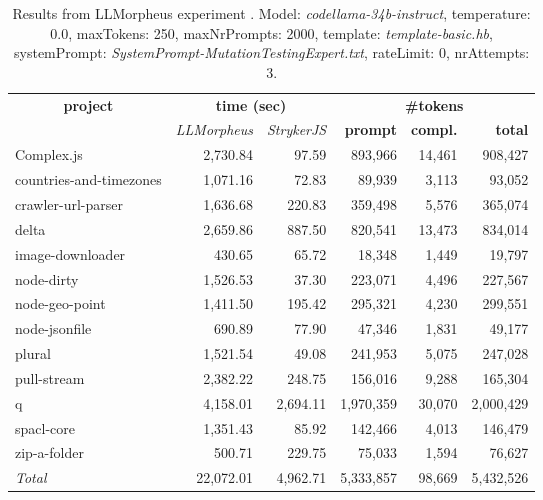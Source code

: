 
\begin{table*}[hbt!]
\centering
{\scriptsize
\begin{tabular}{l||r|r|r|r|r}
\multicolumn{1}{c|}{\bf project} & \multicolumn{2}{|c|}{\bf time (sec)} & \multicolumn{3}{|c|}{\bf \#tokens} \\
               & {\it LLMorpheus} & {\it StrykerJS} & {\bf prompt} & {\bf compl.} & {\bf total} \\
\hline
  Complex.js & 2,730.84 & 97.59 & 893,966 & 14,461 & 908,427 \\ 
countries-and-timezones & 1,071.16 & 72.83 & 89,939 & 3,113 & 93,052 \\ 
crawler-url-parser & 1,636.68 & 220.83 & 359,498 & 5,576 & 365,074 \\ 
delta & 2,659.86 & 887.50 & 820,541 & 13,473 & 834,014 \\ 
image-downloader & 430.65 & 65.72 & 18,348 & 1,449 & 19,797 \\ 
node-dirty & 1,526.53 & 37.30 & 223,071 & 4,496 & 227,567 \\ 
node-geo-point & 1,411.50 & 195.42 & 295,321 & 4,230 & 299,551 \\ 
node-jsonfile & 690.89 & 77.90 & 47,346 & 1,831 & 49,177 \\ 
plural & 1,521.54 & 49.08 & 241,953 & 5,075 & 247,028 \\ 
pull-stream & 2,382.22 & 248.75 & 156,016 & 9,288 & 165,304 \\ 
q & 4,158.01 & 2,694.11 & 1,970,359 & 30,070 & 2,000,429 \\ 
spacl-core & 1,351.43 & 85.92 & 142,466 & 4,013 & 146,479 \\ 
zip-a-folder & 500.71 & 229.75 & 75,033 & 1,594 & 76,627 \\ 
\hline
  \textit{Total} & 22,072.01 & 4,962.71 & 5,333,857 & 98,669 & 5,432,526 \\
  \end{tabular}
  }
  \\[2mm]
  \caption{Results from LLMorpheus experiment .
    Model: \textit{codellama-34b-instruct}, 
    temperature: 0.0, 
    maxTokens: 250, 
    maxNrPrompts: 2000, 
    template: \textit{template-basic.hb}, 
    systemPrompt: \textit{SystemPrompt-MutationTestingExpert.txt}, 
    rateLimit: 0, 
    nrAttempts: 3.  
  }
  \label{table:Cost:run392:codellama-34b-instruct:template-basic.hb:0.0}
\end{table*}